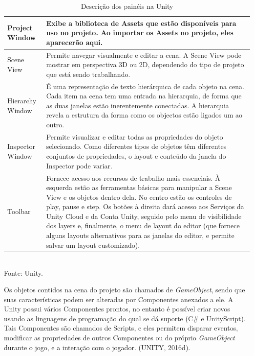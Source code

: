 \documentclass[12pt,a4paper]{article}
\newcommand{\source}[1]{\small Fonte: {#1}}
\begin{document}
			\begin{table}[ht]
				\label{tabelaUnity}
				\caption{Descrição dos painéis na Unity}
				\centering
				\small
				\begin{tabular}{p{3.1cm} p{11.9cm}}
					\hline 
					Project Window & Exibe a biblioteca de Assets que estão disponíveis para uso no projeto. Ao importar os Assets no projeto, eles aparecerão aqui. \\ 
					\hline 
					Scene View & Permite navegar visualmente e editar a cena. A Scene View pode mostrar em perspectiva 3D ou 2D, dependendo do tipo de projeto que está sendo trabalhando. \\ 
					\hline 
					Hierarchy Window & É uma representação de texto hierárquica de cada objeto na cena. Cada item na cena tem uma entrada na hierarquia, de forma que as duas janelas estão inerentemente conectadas. A hierarquia revela a estrutura da forma como os objectos estão ligados um ao outro. \\ 
					\hline 
					Inspector Window & Permite visualizar e editar todas as propriedades do objeto selecionado. Como diferentes tipos de objetos têm diferentes conjuntos de propriedades, o layout e conteúdo da janela do Inspector pode variar. \\ 
					\hline 
					Toolbar & Fornece acesso aos recursos de trabalho mais essenciais. À esquerda estão as ferramentas básicas para manipular a Scene View e os objetos dentro dela. No centro estão os controles de play, pause e step. Os botões à direita dará acesso aos Serviços da Unity Cloud e da Conta Unity, seguido pelo menu de visibilidade dos layers e, finalmente, o menu de layout do editor (que fornece alguns layouts alternativos para as janelas do editor, e permite salvar um layout customizado). \\ 
					\hline 
				\end{tabular}\\
				\vspace{3mm}
				\source{Unity.}
			\end{table}
			
			Os objetos contidos na cena do projeto são chamados de \textit{GameObject},
			sendo que suas características podem ser alteradas por Componentes anexados a ele.
			A Unity possui vários Componentes prontos,
			no entanto é possível criar novos usando as linguagens de programação do qual se dá suporte (C\# e UnityScript).
			Tais Componentes são chamados de Scripts,
			e eles permitem disparar eventos,
			modificar as propriedades de outros Componentes ou do próprio \textit{GameObject} durante o jogo,
			e a interação com o jogador.
			(UNITY, 2016d).
\end{document}
